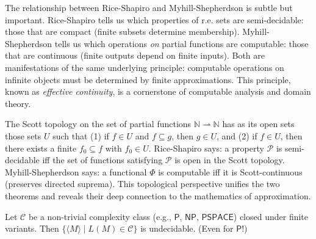 The relationship between Rice-Shapiro and Myhill-Shepherdson is subtle but important. Rice-Shapiro tells us which properties of r.e. sets are semi-decidable: those that are compact (finite subsets determine membership). Myhill-Shepherdson tells us which operations \emph{on} partial functions are computable: those that are continuous (finite outputs depend on finite inputs). Both are manifestations of the same underlying principle: computable operations on infinite objects must be determined by finite approximations. This principle, known as \emph{effective continuity}, is a cornerstone of computable analysis and domain theory.

The Scott topology on the set of partial functions $\mathbb{N} \rightharpoonup \mathbb{N}$ has as its open sets those sets $U$ such that (1) if $f \in U$ and $f \subseteq g$, then $g \in U$, and (2) if $f \in U$, then there exists a finite $f_0 \subseteq f$ with $f_0 \in U$. Rice-Shapiro says: a property $\mathcal{P}$ is semi-decidable iff the set of functions satisfying $\mathcal{P}$ is open in the Scott topology. Myhill-Shepherdson says: a functional $\Phi$ is computable iff it is Scott-continuous (preserves directed suprema). This topological perspective unifies the two theorems and reveals their deep connection to the mathematics of approximation.

\begin{theorem}
Let $\mathcal{C}$ be a non-trivial complexity class (e.g., $\mathsf{P}$, $\mathsf{NP}$, $\mathsf{PSPACE}$) closed under finite variants. Then $\{ \langle M \rangle \mid L(M) \in \mathcal{C} \}$ is undecidable. (Even for $\mathsf{P}$!)
\end{theorem}


